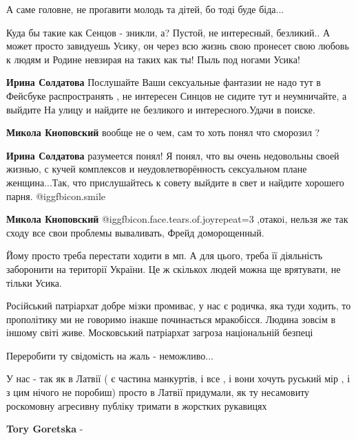 \begin{itemize}
А саме головне, не проґавити молодь та дітей, бо тоді буде біда...


Куда бы такие как Сенцов - зникли, а? Пустой, не интересный, безликий.. А может
просто завидуешь Усику, он через всю жизнь свою пронесет свою любовь к людям и
Родине невзирая на таких как ты! Пыль под ногами Усика!

\begin{itemize} %
\textbf{Ирина Солдатова} Послушайте Ваши сексуальные фантазии не надо тут в Фейсбуке распространять , не интересен Синцов не сидите тут и неумничайте, а выйдите На улицу и найдите не безликого и интересного.Удачи в поиске.

\textbf{Микола Кноповский} вообще не о чем, сам то хоть понял что сморозил ?

\textbf{Ирина Солдатова} разумеется понял! Я понял, что вы очень недовольны своей жизнью, с кучей комплексов и неудовлетворённость сексуальном плане женщина...Так, что прислушайтесь к совету выйдите в свет и найдите хорошего парня. @igg{fbicon.smile} 

\textbf{Микола Кноповский}  @igg{fbicon.face.tears.of.joy}{repeat=3} ,отакоi, нельзя же так сходу все свои проблемы вываливать, Фрейд доморощенный.
\end{itemize} %


Йому просто треба перестати ходити в мп. А для цього, треба її діяльність
заборонити на території України. Це ж скількох людей можна ще врятувати, не
тільки Усика.



Російський патріархат добре мізки промиває, у нас є родичка, яка туди ходить,
то прополітику ми не говоримо інакше починається мракобісся. Людина зовсім в
іншому світі живе. Московський патріархат загроза національній безпеці



Переробити ту свідомість на жаль - неможливо...

У нас - так як в Латвії ( є частина манкуртів, і все , і вони хочуть руський
мір , і з цим нічого не поробиш) просто в Латвії придумали, як ту несамовиту
роскомовну агресивну публіку тримати в жорстких рукавицях

\begin{itemize} %
\textbf{Tory Goretska} - 


\end{itemize}
\end{itemize}
